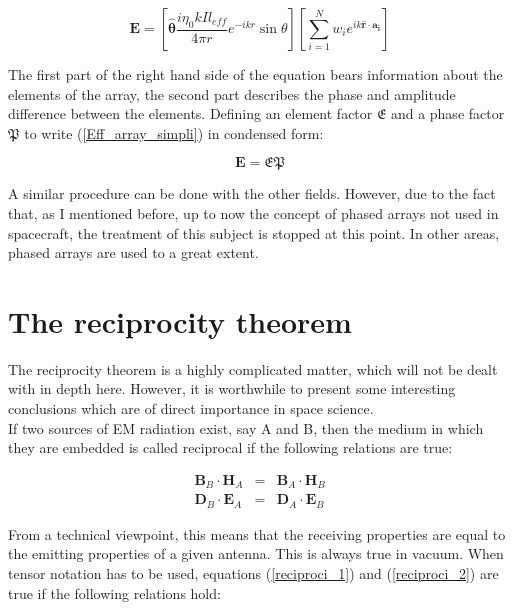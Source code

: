 \documentclass[a4paper,14pt]{extbook}
\begin{document}
\begin{equation}\label{Eff_array_simpli}
\mathbf{E} = \left[ \mathbf{\hat{\theta}} \frac{i \eta_0 k I l_{eff}}{4 \pi r} e^{-ikr } \sin \theta \right] \left[ \sum_{i=1}^N w_i e^{ik \mathbf{\hat{r}} \cdot \mathbf{a_i}} \right]
\end{equation}

The first part of the right hand side of the equation bears information about the elements of the array, the second part describes the phase and amplitude difference between the elements. Defining an element factor $\mathfrak{E}$ and a phase factor $\mathfrak{P}$ to write (\ref{Eff_array_simpli}) in condensed form:

\begin{equation}\label{Eff_array_simpli_simpli}
\mathbf{E} = \mathfrak{E}\mathfrak{P}
\end{equation}

A similar procedure can be done with the other fields. However, due to the fact that, as I mentioned before, up to now the concept of phased arrays not used in spacecraft, the treatment of this subject is stopped at this point. In other areas, phased arrays are used to a great extent.

\section{The reciprocity theorem}

The reciprocity theorem is a highly complicated matter, which will not be dealt with in depth here. However, it is worthwhile to present some interesting conclusions which are of direct importance in space science.\\

If two sources of EM radiation exist, say A and B, then the medium in which they are embedded is called reciprocal if the following relations are true:

\begin{eqnarray}
\mathbf{B}_B \cdot \mathbf{H}_A &=& \mathbf{B}_A \cdot \mathbf{H}_B \label{reciproci_1} \\
\mathbf{D}_B \cdot \mathbf{E}_A &=& \mathbf{D}_A \cdot \mathbf{E}_B \label{reciproci_2}
\end{eqnarray}

From a technical viewpoint, this means that the receiving properties are equal to the emitting properties of a given antenna. This is always true in vacuum. When tensor notation has to be used, equations (\ref{reciproci_1}) and (\ref{reciproci_2}) are true if the following relations hold:
\end{document}
